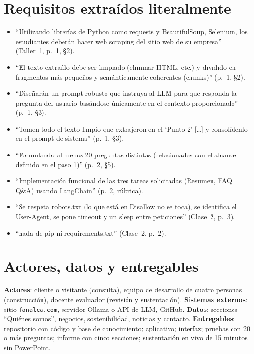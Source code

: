 \section{Requisitos extraídos literalmente}
\begin{itemize}
  \item ``Utilizando librerías de Python como requests y BeautifulSoup, Selenium, los estudiantes deberán hacer
        web scraping del sitio web de su empresa'' (Taller~1, p.~1, §2).
  \item ``El texto extraído debe ser limpiado (eliminar HTML, etc.) y dividido en fragmentos más pequeños y
        semánticamente coherentes (chunks)'' (p.~1, §2).
  \item ``Diseñarán un prompt robusto que instruya al LLM para que responda la pregunta del usuario basándose
        únicamente en el contexto proporcionado'' (p.~1, §3).
  \item ``Tomen todo el texto limpio que extrajeron en el `Punto 2' [\ldots] y consolídenlo en el prompt de
        sistema'' (p.~1, §3).
  \item ``Formulando al menos 20 preguntas distintas (relacionadas con el alcance definido en el paso 1)''
        (p.~2, §5).
  \item ``Implementación funcional de las tres tareas solicitadas (Resumen, FAQ, Q\&A) usando LangChain''
        (p.~2, rúbrica).
  \item ``Se respeta robots.txt (lo que está en Disallow no se toca), se identifica el User-Agent, se pone
        timeout y un sleep entre peticiones'' (Clase~2, p.~3).
  \item ``nada de pip ni requirements.txt'' (Clase~2, p.~2).
\end{itemize}

\section{Actores, datos y entregables}
\textbf{Actores}: cliente o visitante (consulta), equipo de desarrollo de cuatro personas (construcción),
docente evaluador (revisión y sustentación). \textbf{Sistemas externos}: sitio \texttt{fanalca.com}, servidor
Ollama o API de LLM, GitHub. \textbf{Datos}: secciones ``Quiénes somos'', negocios, sostenibilidad, noticias y
contacto. \textbf{Entregables}: repositorio con código y base de conocimiento; aplicativo; interfaz; pruebas
con 20 o más preguntas; informe con cinco secciones; sustentación en vivo de 15 minutos sin PowerPoint.

